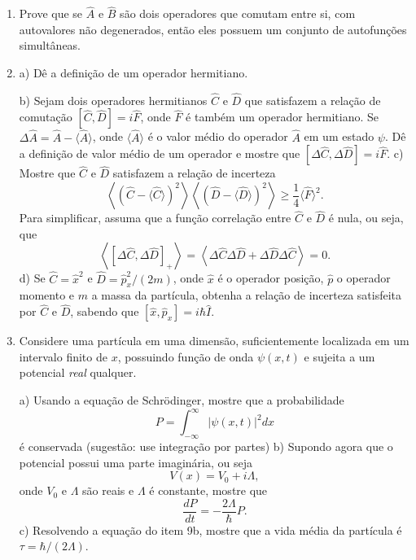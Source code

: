 \begin{enumerate}[start=1,label={\bfseries Q\arabic*.}]
\item Prove que se $\hat{A}$ e $\hat{B}$ são dois operadores que comutam entre si, com autovalores não degenerados, então eles possuem um conjunto de autofunções simultâneas.




\item a) Dê a definição de um operador hermitiano.

  b) Sejam dois operadores hermitianos $\hat{C}$ e $\hat{D}$ que satisfazem a relação de comutação $ \left[ \hat{C}, \hat{D} \right] = i \hat{F}$, onde $\hat{F}$ é também um operador hermitiano. Se $\Delta \hat{A} = \hat{A} - \langle \hat{A} \rangle$, onde $\langle \hat{A} \rangle$ é o valor médio do operador $\hat{A}$ em um estado $\psi$. Dê a definição de valor médio de um operador e mostre que $\left[ \Delta \hat{C}, \Delta \hat{D} \right] = i \hat{F}$.
  c) Mostre que $\hat{C}$ e $\hat{D}$ satisfazem a relação de incerteza
  $$  \left\langle \left( \hat{C} - \langle \hat{C} \rangle \right)^{2} \right\rangle   \left\langle \left( \hat{D} - \langle \hat{D} \rangle \right)^{2} \right\rangle    \geq    \frac{1}{4} \langle \hat{F} \rangle^{2}. $$
  Para simplificar, assuma que a função correlação entre $\hat{C}$ e $\hat{D}$ é nula, ou seja, que
  $$
  \left\langle \left[ \Delta \hat{C}, \Delta \hat{D} \right]_{+}  \right\rangle = \left\langle   \Delta \hat{C} \Delta \hat{D} + \Delta \hat{D} \Delta \hat{C} \right\rangle = 0.
  $$
  d) Se $\hat{C} = \hat{x}^{2}$ e $\hat{D} = \hat{p}^{2}_{x}/(2m)$, onde $\hat{x}$ é o operador posição, $\hat{p}$ o operador momento e $m$ a massa da partícula, obtenha a relação de incerteza satisfeita por $\hat{C}$ e $\hat{D}$, sabendo que $\left[\hat{x}, \hat{p}_{x} \right] = i\hbar \hat{I}$.



\item Considere uma partícula em uma dimensão, suficientemente localizada em um intervalo finito de $x$, possuindo função de onda $\psi(x,t)$ e sujeita a um potencial \textit{real} qualquer.

  a) Usando a equação de Schrödinger, mostre que a probabilidade
  $$ P = \int_{-\infty}^{\infty} | \psi (x,t) |^{2} dx $$
  é conservada (sugestão: use integração por partes)
  b) Supondo agora que o potencial possui uma parte imaginária, ou seja
  $$ V(x) = V_{0} + i \Lambda,$$
  onde $V_{0}$ e $\Lambda$ são reais e $\Lambda$ é constante, mostre que
  $$
  \frac{dP}{dt} = -\frac{2 \Lambda}{\hbar} P.
  $$
  c) Resolvendo a equação do item 9b, mostre que a vida média da partícula é $\tau = \hbar/(2 \Lambda)$.




\end{enumerate}
